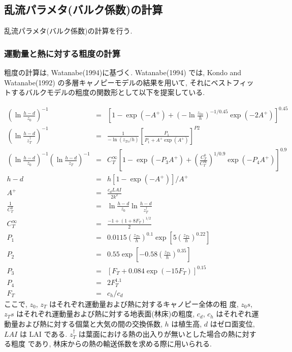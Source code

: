 \subsection{乱流パラメタ(バルク係数)の計算}

乱流パラメタ(バルク係数)の計算を行う. 

\subsubsection{運動量と熱に対する粗度の計算}

粗度の計算は, Watanabe(1994)に基づく. Watanabe(1994) では, Kondo and
Watanabe(1992) の多層キャノピーモデルの結果を用いて, それにベストフィッ
トするバルクモデルの粗度の関数形として以下を提案している. 

\begin{eqnarray}
 \left(\ln \frac{h-d}{z_0}\right)^{-1} &=&
 \left[ 1 - \exp( -A^+) + \left(-\ln \frac{z_{0s}}{h}\right)^{-1/0.45}
  \exp(-2A^+)\right]^{0.45} \\
 \left(\ln \frac{h-d}{z_T^{\dagger}}\right)^{-1} &=&
 \frac{1}{-\ln(z_{Ts}/h)} \left[ \frac{P_1}{P_1 + A^+ \exp({A^+})}\right] ^{P2} \\
 \left(\ln \frac{h-d}{z_0}\right)^{-1} \left(\ln \frac{h-d}{z_T}\right)^{-1}
 &=& C_T^{\infty} \left[1-\exp(-P_3 A^+) 
  + \left(\frac{C_T^0}{C_T^{\infty}}\right)^{1/0.9} \exp(-P_4 A^+)\right]^{0.9} \\
 h-d &=& h [1-\exp(-A^+)] / {A^+} \\
 A^+ &=& \frac{c_d LAI}{2k^2} \\
 \frac1{C_T^0} &=& \ln \frac{h-d}{z_0} \ln \frac{h-d}{z_T^{\dagger}} \\
 C_T^{\infty} &=& \frac{-1+(1+8F_T)^{1/2}}{2} \\
 P_1 &=& 0.0115 \left(\frac{z_{Ts}}{h}\right)^{0.1} 
  \exp\left[5 \left(\frac{z_{Ts}}{h}\right)^{0.22}\right] \\
 P_2 &=& 0.55 \exp\left[-0.58 \left(\frac{z_{Ts}}{h}\right)^{0.35}\right] \\
 P_3 &=& [F_T + 0.084 \exp(-15 F_T)]^{0.15} \\
 P_4 &=& 2 F_T^{1.1} \\
 F_T &=& c_h / c_d
\end{eqnarray}
ここで, $z_0$, $z_T$ はそれぞれ運動量および熱に対するキャノピー全体の粗
度, $z_0s$, $z_Ts$ はそれぞれ運動量および熱に対する地表面(林床)の粗度, 
$c_d$, $c_h$ はそれぞれ運動量および熱に対する個葉と大気の間の交換係数, 
$h$ は植生高, $d$ はゼロ面変位, $LAI$ は LAI である. 
$z_T^{\dagger}$ は葉面における熱の出入りが無いとした場合の熱に対する粗度
であり, 林床からの熱の輸送係数を求める際に用いられる. 

